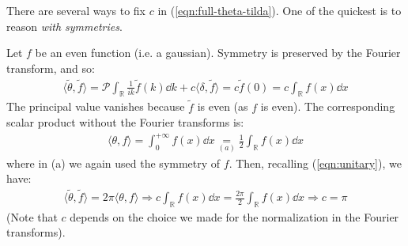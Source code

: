 \documentclass[../template.tex]{subfiles}
\begin{document}
There are several ways to fix $c$ in (\ref{eqn:full-theta-tilda}). One of the quickest is to reason \textit{with symmetries}.

Let $f$ be an even function (i.e. a gaussian). Symmetry is preserved by the Fourier transform, and so:
\begin{align}
    \langle \tilde{\theta}, \tilde{f} \rangle = \mathcal{P} \int_{\mathbb{R}} \frac{1}{ik} \tilde{f}(k) \dd{k} + c \langle \delta, \tilde{f} \rangle = c \tilde{f}(0) = c \int_{\mathbb{R}} f(x) \dd{x} \label{eqn:scalar1}
\end{align}
The principal value vanishes because $\tilde{f}$ is even (as $f$ is even). The corresponding scalar product without the Fourier transforms is:\begin{align}
    \langle \theta, f \rangle = \int_{0}^{+\infty} f(x) \dd{x} \underset{(a)}{=}  \frac{1}{2} \int_{\mathbb{R}} f(x) \dd{x} \label{eqn:scalar2} 
\end{align}
where in (a) we again used the symmetry of $f$. Then, recalling (\ref{eqn:unitary}), we have:
\begin{align*}
    \langle \tilde{\theta}, \tilde{f} \rangle = 2\pi \langle \theta, f \rangle \Rightarrow c\int_{\mathbb{R}} f(x) \dd{x} = \frac{2 \pi}{2} \int_{\mathbb{R}} f(x) \dd{x} \Rightarrow c = \pi 
\end{align*}
(Note that $c$ depends on the choice we made for the normalization in the Fourier transforms).

\medskip
\end{document}
